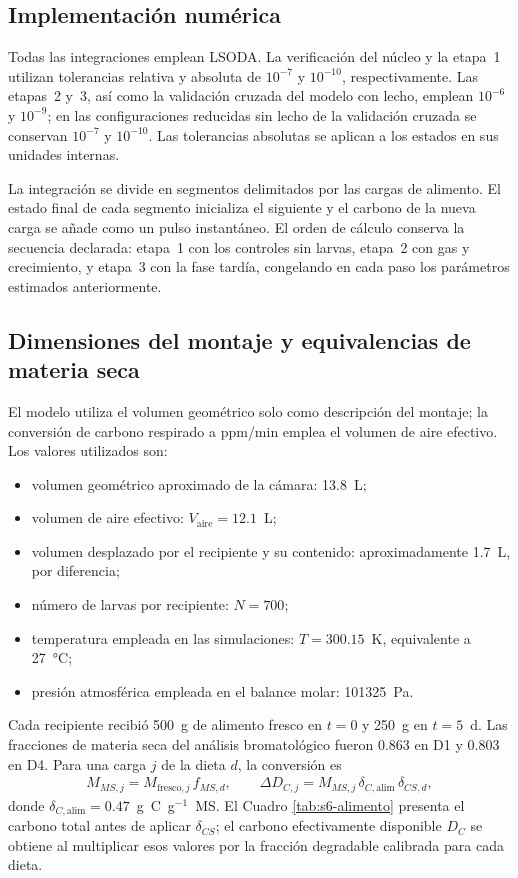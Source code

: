 \subsection*{Implementación numérica}

Todas las integraciones emplean LSODA. La verificación del núcleo y la etapa~1
utilizan tolerancias relativa y absoluta de $10^{-7}$ y $10^{-10}$,
respectivamente. Las etapas~2 y~3, así como la validación cruzada del modelo
con lecho, emplean $10^{-6}$ y $10^{-9}$; en las configuraciones reducidas sin
lecho de la validación cruzada se conservan $10^{-7}$ y $10^{-10}$. Las
tolerancias absolutas se aplican a los estados en sus unidades internas.

La integración se divide en segmentos delimitados por las cargas de alimento.
El estado final de cada segmento inicializa el siguiente y el carbono de la
nueva carga se añade como un pulso instantáneo. El orden de cálculo conserva
la secuencia declarada: etapa~1 con los controles sin larvas, etapa~2 con gas
y crecimiento, y etapa~3 con la fase tardía, congelando en cada paso los
parámetros estimados anteriormente.

\subsection{Dimensiones del montaje y equivalencias de materia seca}
\label{sup:montaje}
El modelo utiliza el volumen geométrico solo como descripción del montaje; la
conversión de carbono respirado a ppm/min emplea el volumen de aire efectivo.
Los valores utilizados son:
\begin{itemize}
  \item volumen geométrico aproximado de la cámara: 13.8~L;
  \item volumen de aire efectivo: $V_{\mathrm{aire}}=12.1$~L;
  \item volumen desplazado por el recipiente y su contenido: aproximadamente
  1.7~L, por diferencia;
  \item número de larvas por recipiente: $N=700$;
  \item temperatura empleada en las simulaciones: $T=300.15$~K, equivalente
  a 27~°C;
  \item presión atmosférica empleada en el balance molar: 101325~Pa.
\end{itemize}

Cada recipiente recibió 500~g de alimento fresco en $t=0$ y 250~g en $t=5$~d.
Las fracciones de materia seca del análisis bromatológico fueron 0.863 en D1 y
0.803 en D4. Para una carga $j$ de la dieta $d$, la conversión es
\begin{align*}
M_{MS,j}=M_{\mathrm{fresco},j}\,f_{MS,d},
\qquad
\Delta D_{C,j}
  =M_{MS,j}\,\delta_{C,\mathrm{alim}}\,\delta_{CS,d},
\end{align*}
donde $\delta_{C,\mathrm{alim}}=0.47$~g~C~g$^{-1}$~MS. El Cuadro
\ref{tab:s6-alimento} presenta el carbono total antes de aplicar
$\delta_{CS}$; el carbono efectivamente disponible $D_C$ se obtiene al
multiplicar esos valores por la fracción degradable calibrada para cada dieta.

